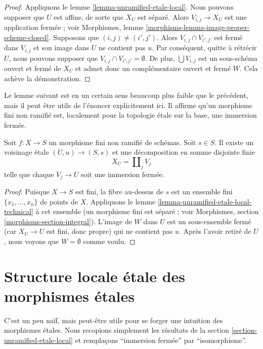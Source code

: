 \begin{proof}
Appliquons
le lemme \ref{lemma-unramified-etale-local}.
Nous pouvons supposer que $U$ est affine, de sorte que $X_U$ est séparé.
Alors $V_{i, j} \to X_U$ est une application fermée ; voir
Morphismes, lemme \ref{morphisms-lemma-image-proper-scheme-closed}.
Supposons que $(i, j) \not = (i', j')$.
Alors $V_{i, j} \cap V_{i', j'}$ est fermé dans $V_{i, j}$ et
son image dans $U$ ne contient pas $u$.
Par conséquent, quitte à rétrécir $U$, nous pouvons supposer que
$V_{i, j} \cap V_{i', j'} = \emptyset$. De plus, $\bigcup V_{i, j}$ est
un sous-schéma ouvert et fermé de $X_U$ et admet donc un
complémentaire ouvert et fermé $W$. Cela achève la démonstration.
\end{proof}

\noindent
Le lemme suivant est en un certain sens beaucoup plus faible que le précédent,
mais il peut être utile de l'énoncer explicitement ici. Il affirme qu'un morphisme fini
non ramifié est, localement pour la topologie \'etale sur la base, une immersion fermée.

\begin{lemma}
\label{lemma-finite-unramified-etale-local}
Soit $f : X \to S$ un morphisme fini non ramifié de schémas.
Soit $s \in S$.
Il existe un voisinage \'etale $(U, u) \to (S, s)$
et une décomposition en somme disjointe finie
$$
X_U = \coprod\nolimits_j V_j
$$
telle que chaque $V_j \to U$ soit une immersion fermée.
\end{lemma}

\begin{proof}
Puisque $X \to S$ est fini, la fibre au-dessus de $s$ est un ensemble fini
$\{x_1, \ldots, x_n\}$ de points de $X$. Appliquons le
lemme \ref{lemma-unramified-etale-local-technical}
à cet ensemble (un morphisme fini est séparé ; voir
Morphismes, section \ref{morphisms-section-integral}).
L'image de $W$ dans $U$ est un sous-ensemble fermé
(car $X_U \to U$ est fini, donc propre) qui ne
contient pas $u$. Après l'avoir retiré de $U$, nous voyons que $W = \emptyset$
comme voulu.
\end{proof}




\section{Structure locale \'etale des morphismes \'etales}
\label{section-etale-local-etale}

\noindent
C'est un peu naïf, mais peut-être utile pour se forger une intuition des morphismes \'etales.
Nous recopions simplement les résultats de la
section \ref{section-unramified-etale-local}
et remplaçons ``immersion fermée'' par ``isomorphisme''.

